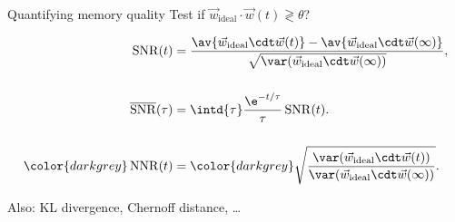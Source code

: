 \documentclass[final]{beamer}%
\DeclareMathOperator{\snr}{SNR}
\newcommand{\snrb}{\overline{\snr}}
\newcommand{\syn}{\vec{w}}
\newcommand{\synid}{\syn_\text{ideal}}
\begin{document}

\begin{frame}{Quantifying memory quality}
%
 Test if $\synid \cdot \syn(t) \gtrless \theta$?


 \vp
 \parbox[t]{0.4\linewidth}{%
 }
 \parbox[t]{0.55\linewidth}{%
 \vspace{-\baselineskip}
 \begin{equation*}
   \begin{aligned}
     \snr(t) &= \frac{ \av{\synid\cdt\syn(t)} - \av{\synid\cdt\syn(\infty)} }{ \sqrt{\var(\synid\cdt\syn(\infty))}},
     \\[\baselineskip]
     \snrb(\tau) &= \intd{\tau} \frac{\e^{-t/\tau}}{\tau} \snr(t).
     \\[\baselineskip]
     \color{darkgrey} \operatorname{NNR}(t) &= \color{darkgrey} \sqrt{\frac{ \var(\synid\cdt\syn(t)) }{ \var(\synid\cdt\syn(\infty)) }}.
   \end{aligned}
 \end{equation*}
 }
 Also: KL divergence, Chernoff distance, \ldots
%
\end{frame}

\end{document}
